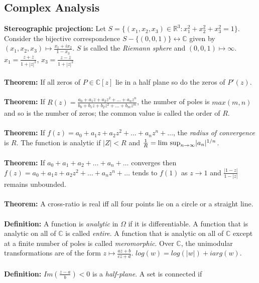 \subsection{Complex Analysis}
{\bf Stereographic projection:}
Let $S= \{ (x_1 , x_2 , x_3 ) \in {\mathbb R}^3: x_1^2 + x_2^2 + x_3^2 = 1 \}$.
Consider the bijective correspondence $S - \{(0,0,1)\} \leftrightarrow {\mathbb C}$ given by
$(x_1, x_2, x_3) \mapsto {\frac {x_1 + i x_2} {1-x_3}}$.  $S$ is called the \emph{Riemann sphere} and
$(0,0,1) \mapsto \infty$.  
$x_1= {\frac {z + {\overline z}}{1+|z|^2}}$,
$x_3= {\frac {z - {\overline z}}{1+|z|^2}}$
\\
\\
{\bf Theorem:}  If all zeros of $P \in {\mathbb C}[z]$ lie in a half plane so do the zeros of $P'(z)$.
\\
\\
{\bf Theorem:}  If $R(z)= {\frac {a_0 + a_1 z + a_2 z^2 + \ldots + a_n z^n}
{b_0 + b_1 z + b_2 z^2 + \ldots + b_m z^m}
}$, the number of poles is $max(m,n)$ and so is the number of zeros; the common value is called the
order of $R$.
\\
\\
{\bf Theorem:}  If $f(z)= a_0 + a_1 z + a_2 z^2 + \ldots + a_n z^n + \ldots $, the \emph{radius of convergence} is
$R$.  The function is analytic if $|Z| <R$ and
${\frac 1 R}= \textnormal{lim sup}_{n \rightarrow \infty} |a_n|^{1/n}$.
\\
\\
{\bf Theorem:}  If $a_0 + a_1  + a_2  + \ldots + a_n + \ldots $ converges then
$f(z)= a_0 + a_1 z + a_2 z^2 + \ldots + a_n z^n + \ldots $ tends to $f(1)$ as $z \rightarrow 1$ and
${\frac {|1-z|}{1-|z|}}$ remains unbounded.
\\
\\
{\bf Theorem:}  A cross-ratio is real iff all four points lie on a circle or a straight line.
\\
\\
{\bf Definition:} A function is \emph{analytic} in $\Omega$ if it is differentiable.
A function that is analytic on all of ${\mathbb C}$ is called \emph{entire}.  A function that
is analytic on all of ${\mathbb C}$ except at a finite number of poles is called \emph{meromorphic}.
Over ${\mathbb C}$, the unimodular transformations are of the form $z \mapsto {\frac {az+b} {cz+d}}$.
$log(w)= log(|w|)+iarg(w)$.
\\
\\
{\bf Definition:} $Im({\frac {z-a} {b}})<0$ is a \emph{half-plane}.  A set is connected if
